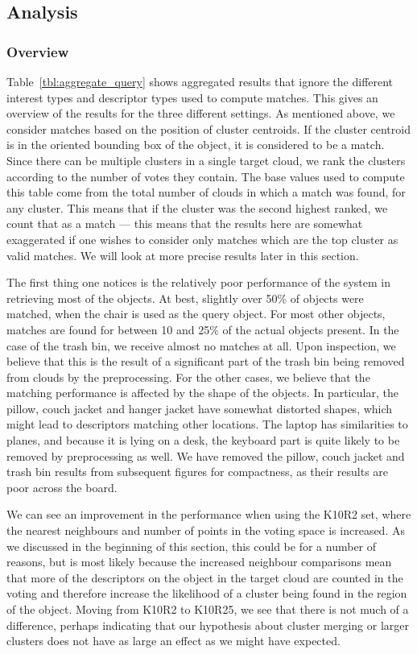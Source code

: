 \documentclass[11pt,a4paper]{kth-mag}
\begin{document}
\subsection{Analysis}
\subsubsection{Overview}
Table~\ref{tbl:aggregate_query} shows aggregated results that ignore the
different interest types and descriptor types used to compute matches. This
gives an overview of the results for the three different settings. As mentioned
above, we consider matches based on the position of cluster centroids. If the
cluster centroid is in the oriented bounding box of the object, it is considered
to be a match. Since there can be multiple clusters in a single target cloud, we
rank the clusters according to the number of votes they contain. The base values
used to compute this table come from the total number of clouds in which a match
was found, for any cluster. This means that if the cluster was the second
highest ranked, we count that as a match --- this means that the results here
are somewhat exaggerated if one wishes to consider only matches which are the
top cluster as valid matches. We will look at more precise results later in this
section.

The first thing one notices is the relatively poor performance of the system in
retrieving most of the objects. At best, slightly over 50\% of objects were
matched, when the chair is used as the query object. For most other objects,
matches are found for between 10 and 25\% of the actual objects present. In the
case of the trash bin, we receive almost no matches at all. Upon inspection, we
believe that this is the result of a significant part of the trash bin being
removed from clouds by the preprocessing. For the other cases, we believe that
the matching performance is affected by the shape of the objects. In particular,
the pillow, couch jacket and hanger jacket have somewhat distorted shapes, which
might lead to descriptors matching other locations. The laptop has similarities
to planes, and because it is lying on a desk, the keyboard part is quite likely
to be removed by preprocessing as well. We have removed the pillow, couch jacket
and trash bin results from subsequent figures for compactness, as their results
are poor across the board.

We can see an improvement in the performance when using the K10R2 set, where the
nearest neighbours and number of points in the voting space is increased. As we
discussed in the beginning of this section, this could be for a number of
reasons, but is most likely because the increased neighbour comparisons mean
that more of the descriptors on the object in the target cloud are counted in
the voting and therefore increase the likelihood of a cluster being found in the
region of the object. Moving from K10R2 to K10R25, we see that there is not much
of a difference, perhaps indicating that our hypothesis about cluster merging or
larger clusters does not have as large an effect as we might have expected.
\end{document}

